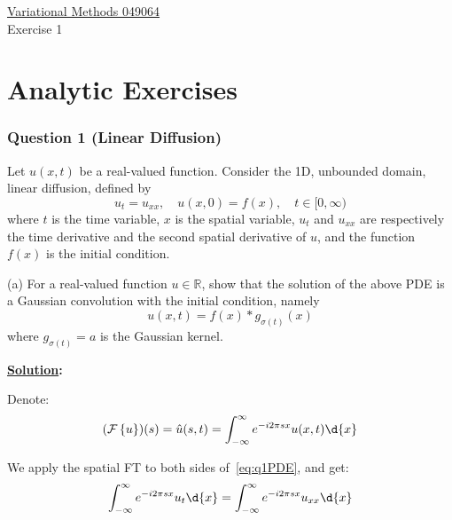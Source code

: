 \documentclass{article}
\begin{document}
\begin{center}
  {\huge \underline{Variational Methods 049064} \\[7pt] Exercise 1}
\end{center}
\part{Analytic Exercises}
\section*{Question 1 (Linear Diffusion)}
Let $u(x,t)$ be a real-valued function. Consider the 1D, unbounded domain, linear diffusion, defined by
\begin{equation} \label{eq:q1PDE}
u_t = u_{xx}, \quad u(x,0) = f(x), \quad t \in [0, \infty)
\end{equation}
where \(t\) is the time variable, \(x\) is the spatial variable, \(u_t\) and \(u_{xx}\) are respectively the time derivative and the second spatial derivative of \(u\), and the function \(f(x)\) is the initial condition.

(a) For a real-valued function \(u \in \mathbb{R}\), show that the solution of the above PDE is a Gaussian convolution with the initial condition, namely
\begin{equation}
  u(x,t) = f(x) * g_{\sigma(t)}(x)
\end{equation}
where $g_{\sigma(t)} = a$ is the Gaussian kernel.

\textbf{\ul{Solution}:} 

Denote:
\[
  (\mathcal{F} \left\{ u \right\})(s) =   \hat{u}(s,t) = \int_{-\infty}^{\infty} e^{-i 2 \pi s x} u(x,t) \d{x}
\]

We apply the spatial FT to both sides of~\cref{eq:q1PDE}, and get:
\[
  \int_{-\infty}^{\infty} e^{- i 2 \pi s x} u_{t} \d{x} = \int_{-\infty}^{\infty} e^{-i 2\pi s x} u_{xx}   \d{x}
\]
\end{document}
